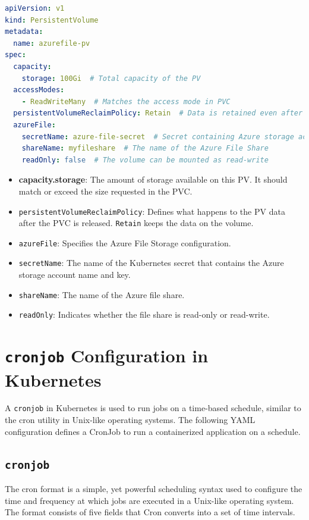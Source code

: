 \documentclass{article}
\begin{document}
\begin{lstlisting}[language=yaml]
apiVersion: v1
kind: PersistentVolume
metadata:
  name: azurefile-pv
spec:
  capacity:
    storage: 100Gi  # Total capacity of the PV
  accessModes:
    - ReadWriteMany  # Matches the access mode in PVC
  persistentVolumeReclaimPolicy: Retain  # Data is retained even after PVC is deleted
  azureFile:
    secretName: azure-file-secret  # Secret containing Azure storage account info
    shareName: myfileshare  # The name of the Azure File Share
    readOnly: false  # The volume can be mounted as read-write
\end{lstlisting}

\begin{itemize}
    \item \textbf{capacity.storage}: The amount of storage available on this PV. It should match or exceed the size requested in the PVC.
    \item \texttt{persistentVolumeReclaimPolicy}: Defines what happens to the PV data after the PVC is released. \texttt{Retain} keeps the data on the volume.
    \item \texttt{azureFile}: Specifies the Azure File Storage configuration.
    \item \texttt{secretName}: The name of the Kubernetes secret that contains the Azure storage account name and key.
    \item \texttt{shareName}: The name of the Azure file share.
    \item \texttt{readOnly}: Indicates whether the file share is read-only or read-write.
\end{itemize}


\section{\texttt{cronjob} Configuration in Kubernetes}

A \texttt{cronjob} \cite{cronjob} in Kubernetes is used to run jobs on a time-based schedule, similar to the cron utility in Unix-like operating systems. The following YAML configuration defines a CronJob to run a containerized application on a schedule.

\subsection{\texttt{cronjob}} \label{cronJ}  

The cron format is a simple, yet powerful scheduling syntax used to configure the time and frequency at which jobs are executed in a Unix-like operating system. The format consists of five fields that Cron converts into a set of time intervals.
\end{document}
